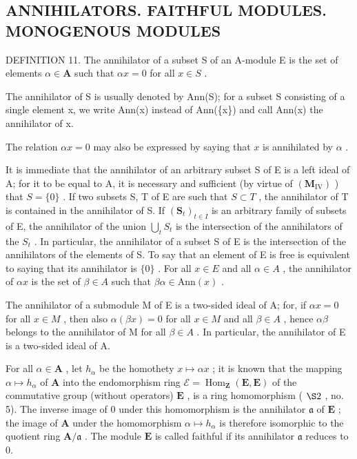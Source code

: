 \subsection{ANNIHILATORS. FAITHFUL MODULES. MONOGENOUS MODULES}

DEFINITION 11. The annihilator of a subset S of an A-module E is the set of elements \(\alpha \in \mathbf{A}\) such that \(\alpha x = 0\) for all \(x \in S\) .

The annihilator of S is usually denoted by Ann(S); for a subset S consisting of a single element x, we write Ann(x) instead of Ann(\{x\}) and call Ann(x) the annihilator of x.

The relation \(\alpha x = 0\) may also be expressed by saying that \(x\) is annihilated by \(\alpha\) .

It is immediate that the annihilator of an arbitrary subset S of E is a left ideal of A; for it to be equal to A, it is necessary and sufficient (by virtue of \((\mathbf{M}_{\mathrm{IV}})\) ) that \(S = \{0\}\) . If two subsets S, T of E are such that \(S \subset T\) , the annihilator of T is contained in the annihilator of S. If \((\mathbf{S}_{t})_{t \in I}\) is an arbitrary family of subsets of E, the annihilator of the union \(\bigcup_{t} S_{t}\) is the intersection of the annihilators of the \(S_{t}\) . In particular, the annihilator of a subset S of E is the intersection of the annihilators of the elements of S. To say that an element of E is free is equivalent to saying that its annihilator is \(\{0\}\) . For all \(x \in E\) and all \(\alpha \in A\) , the annihilator of \(\alpha x\) is the set of \(\beta \in A\) such that \(\beta \alpha \in \text{Ann}(x)\) .

The annihilator of a submodule M of E is a two-sided ideal of A; for, if \(\alpha x = 0\) for all \(x \in M\) , then also \(\alpha(\beta x) = 0\) for all \(x \in M\) and all \(\beta \in A\) , hence \(\alpha\beta\) belongs to the annihilator of M for all \(\beta \in A\) . In particular, the annihilator of E is a two-sided ideal of A.

For all \(\alpha \in \mathbf{A}\) , let \(h_{\alpha}\) be the homothety \(x \mapsto \alpha x\) ; it is known that the mapping \(\alpha \mapsto h_{\alpha}\) of \(\mathbf{A}\) into the endomorphism ring \(\mathcal{E} = \operatorname{Hom}_{\mathbf{Z}}(\mathbf{E}, \mathbf{E})\) of the commutative group (without operators) \(\mathbf{E}\) , is a ring homomorphism ( \(\S 2\) , no. 5). The inverse image of 0 under this homomorphism is the annihilator \(\mathfrak{a}\) of \(\mathbf{E}\) ; the image of \(\mathbf{A}\) under the homomorphism \(\alpha \mapsto h_{\alpha}\) is therefore isomorphic to the quotient ring \(\mathbf{A}/\mathfrak{a}\) . The module \(\mathbf{E}\) is called faithful if its annihilator \(\mathfrak{a}\) reduces to 0.

